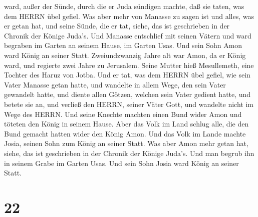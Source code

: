 ward, außer der Sünde, durch die er Juda sündigen machte, daß sie taten,
was dem HERRN übel gefiel.  Was aber mehr von Manasse zu
sagen ist und alles, was er getan hat, und seine Sünde, die er tat,
siehe, das ist geschrieben in der Chronik der Könige Juda's.
 Und Manasse entschlief mit seinen Vätern und ward begraben
im Garten an seinem Hause, im Garten Usas. Und sein Sohn Amon ward König
an seiner Statt.  Zweiundzwanzig Jahre alt war Amon, da er
König ward, und regierte zwei Jahre zu Jerusalem. Seine Mutter hieß
Mesullemeth, eine Tochter des Haruz von Jotba.  Und er tat,
was dem HERRN übel gefiel, wie sein Vater Manasse getan hatte,
 und wandelte in allem Wege, den sein Vater gewandelt
hatte, und diente allen Götzen, welchen sein Vater gedient hatte, und
betete sie an,  und verließ den HERRN, seiner Väter Gott,
und wandelte nicht im Wege des HERRN.  Und seine Knechte
machten einen Bund wider Amon und töteten den König in seinem Hause.
 Aber das Volk im Land schlug alle, die den Bund gemacht
hatten wider den König Amon. Und das Volk im Lande machte Josia, seinen
Sohn zum König an seiner Statt.  Was aber Amon mehr getan
hat, siehe, das ist geschrieben in der Chronik der Könige Juda's.
 Und man begrub ihn in seinem Grabe im Garten Usas. Und
sein Sohn Josia ward König an seiner Statt.

\hypertarget{section-21}{%
\section{22}\label{section-21}}


